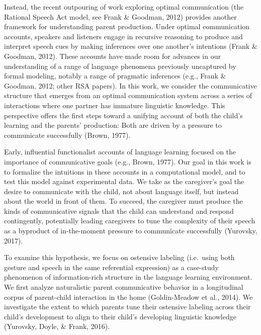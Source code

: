 \documentclass[english,,man,floatsintext]{apa6}
\begin{document}
Instead, the recent outpouring of work exploring optimal communication (the Rational Speech Act model, see Frank \& Goodman, 2012) provides another framework for understanding parent production. Under optimal communication accounts, speakers and listeners engage in recursive reasoning to produce and interpret speech cues by making inferences over one another's intentions (Frank \& Goodman, 2012). These accounts have made room for advances in our understanding of a range of language phenomena previously uncaptured by formal modeling, notably a range of pragmatic inferences (e.g., Frank \& Goodman, 2012; other RSA papers). In this work, we consider the communicative structure that emerges from an optimal communication system across a series of interactions where one partner has immature linguistic knowledge. This perspective offers the first steps toward a unifying account of both the child's learning and the parents' production: Both are driven by a pressure to communicate successfully (Brown, 1977).

Early, influential functionalist accounts of language learning focused on the importance of communicative goals (e.g., Brown, 1977). Our goal in this work is to formalize the intuitions in these accounts in a computational model, and to test this model against experimental data. We take as the caregiver's goal the desire to communicate with the child, not about language itself, but instead about the world in front of them. To succeed, the caregiver must produce the kinds of communicative signals that the child can understand and respond contingently, potentially leading caregivers to tune the complexity of their speech as a byproduct of in-the-moment pressure to communicate successfully (Yurovsky, 2017).

To examine this hypothesis, we focus on ostensive labeling (i.e.~using both gesture and speech in the same referential expression) as a case-study phenomenon of information-rich structure in the language learning environment. We first analyze naturalistic parent communicative behavior in a longitudinal corpus of parent-child interaction in the home (Goldin-Meadow et al., 2014). We investigate the extent to which parents tune their ostensive labeling across their child's development to align to their child's developing linguistic knowledge (Yurovsky, Doyle, \& Frank, 2016).
\end{document}
